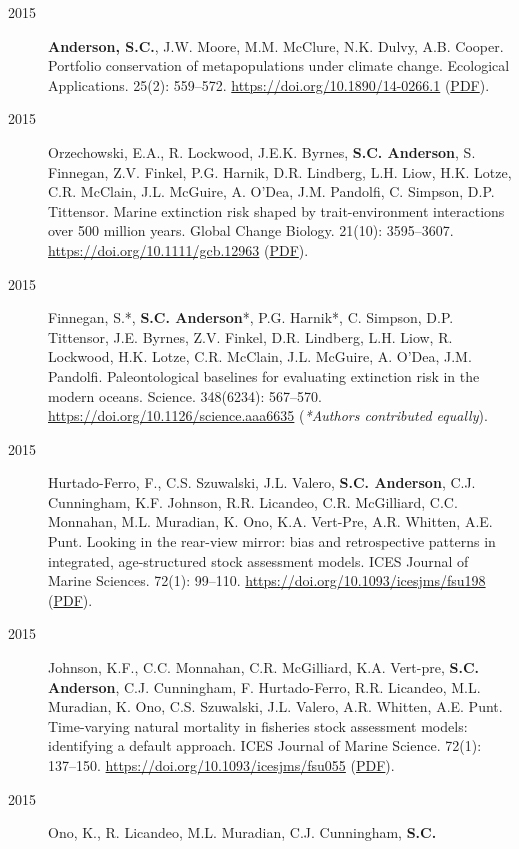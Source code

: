 \begin{description}
\item[2015]
\textbf{Anderson, S.C.}, J.W. Moore, M.M. McClure, N.K. Dulvy, A.B.
Cooper. Portfolio conservation of metapopulations under climate change.
Ecological Applications. 25(2): 559--572.
\url{https://doi.org/10.1890/14-0266.1}
(\href{https://www.dropbox.com/s/141rsnv5rc7mi5i/Anderson_etal_2015_salmonportfolios.pdf?dl=1}{PDF}).
\item[2015]
Orzechowski, E.A., R. Lockwood, J.E.K. Byrnes, \textbf{S.C. Anderson},
S. Finnegan, Z.V. Finkel, P.G. Harnik, D.R. Lindberg, L.H. Liow, H.K.
Lotze, C.R. McClain, J.L. McGuire, A. O'Dea, J.M. Pandolfi, C. Simpson,
D.P. Tittensor. Marine extinction risk shaped by trait-environment
interactions over 500 million years. Global Change Biology. 21(10):
3595--3607. \url{https://doi.org/10.1111/gcb.12963}
(\href{https://sean.updog.co/papers/Orzechowski_etal_2015_paleometa.pdf}{PDF}).
\item[2015]
Finnegan, S.*, \textbf{S.C. Anderson}*, P.G. Harnik*, C. Simpson, D.P.
Tittensor, J.E. Byrnes, Z.V. Finkel, D.R. Lindberg, L.H. Liow, R.
Lockwood, H.K. Lotze, C.R. McClain, J.L. McGuire, A. O'Dea, J.M.
Pandolfi. Paleontological baselines for evaluating extinction risk in
the modern oceans. Science. 348(6234): 567--570.
\url{https://doi.org/10.1126/science.aaa6635} (\emph{*Authors
contributed equally}).
\item[2015]
Hurtado-Ferro, F., C.S. Szuwalski, J.L. Valero, \textbf{S.C. Anderson},
C.J. Cunningham, K.F. Johnson, R.R. Licandeo, C.R. McGilliard, C.C.
Monnahan, M.L. Muradian, K. Ono, K.A. Vert-Pre, A.R. Whitten, A.E. Punt.
Looking in the rear-view mirror: bias and retrospective patterns in
integrated, age-structured stock assessment models. ICES Journal of
Marine Sciences. 72(1): 99--110.
\url{https://doi.org/10.1093/icesjms/fsu198}
(\href{https://sean.updog.co/papers/Hurtado-Ferro_etal_2014_retrospective.pdf}{PDF}).
\item[2015]
Johnson, K.F., C.C. Monnahan, C.R. McGilliard, K.A. Vert-pre,
\textbf{S.C. Anderson}, C.J. Cunningham, F. Hurtado-Ferro, R.R.
Licandeo, M.L. Muradian, K. Ono, C.S. Szuwalski, J.L. Valero, A.R.
Whitten, A.E. Punt. Time-varying natural mortality in fisheries stock
assessment models: identifying a default approach. ICES Journal of
Marine Science. 72(1): 137--150.
\url{https://doi.org/10.1093/icesjms/fsu055}
(\href{http://icesjms.oxfordjournals.org/content/early/2014/04/09/icesjms.fsu055.full.pdf?keytype=ref&ijkey=NEXmZIkz3289u3z}{PDF}).
\item[2015]
Ono, K., R. Licandeo, M.L. Muradian, C.J. Cunningham, \textbf{S.C.
}
\end{description}
